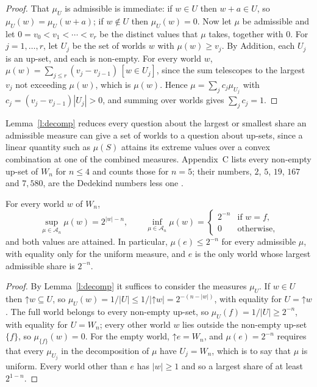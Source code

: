 \documentclass{situationist-preprint}
\begin{document}
\begin{proof}
That $\mu_U$ is admissible is immediate: if $w \in U$ then $w + a \in U$, so $\mu_U(w) = \mu_U(w + a)$; if $w \notin U$ then $\mu_U(w) = 0$. Now let $\mu$ be admissible and let $0 = v_0 < v_1 < \cdots < v_r$ be the distinct values that $\mu$ takes, together with $0$. For $j = 1, \ldots, r$, let $U_j$ be the set of worlds $w$ with $\mu(w) \geq v_j$. By Addition, each $U_j$ is an up-set, and each is non-empty. For every world $w$, $\mu(w) = \sum_{j \leq r} (v_j - v_{j-1})\,[w \in U_j]$, since the sum telescopes to the largest $v_j$ not exceeding $\mu(w)$, which is $\mu(w)$. Hence $\mu = \sum_j c_j \mu_{U_j}$ with $c_j = (v_j - v_{j-1})|U_j| > 0$, and summing over worlds gives $\sum_j c_j = 1$.
\end{proof}

Lemma~\ref{l:decomp} reduces every question about the largest or smallest share an admissible measure can give a set of worlds to a question about up-sets, since a linear quantity such as $\mu(S)$ attains its extreme values over a convex combination at one of the combined measures. Appendix~C lists every non-empty up-set of $W_n$ for $n \leq 4$ and counts those for $n = 5$; their numbers, $2$, $5$, $19$, $167$ and $7{,}580$, are the Dedekind numbers less one \citep{Kleitman1969}.

\begin{proposition}\label{p:extreme}
For every world $w$ of $W_n$,
\[
\sup_{\mu \in \mathcal{A}_n} \mu(w) = 2^{|w| - n}, \qquad \inf_{\mu \in \mathcal{A}_n} \mu(w) = \begin{cases} 2^{-n} & \text{if } w = f,\\ 0 & \text{otherwise,}\end{cases}
\]
and both values are attained. In particular, $\mu(e) \leq 2^{-n}$ for every admissible $\mu$, with equality only for the uniform measure, and $e$ is the only world whose largest admissible share is $2^{-n}$.
\end{proposition}

\begin{proof}
By Lemma~\ref{l:decomp} it suffices to consider the measures $\mu_U$. If $w \in U$ then $\mathord{\uparrow} w \subseteq U$, so $\mu_U(w) = 1/|U| \leq 1/|\mathord{\uparrow} w| = 2^{-(n - |w|)}$, with equality for $U = \mathord{\uparrow} w$. The full world belongs to every non-empty up-set, so $\mu_U(f) = 1/|U| \geq 2^{-n}$, with equality for $U = W_n$; every other world $w$ lies outside the non-empty up-set $\{f\}$, so $\mu_{\{f\}}(w) = 0$. For the empty world, $\mathord{\uparrow} e = W_n$, and $\mu(e) = 2^{-n}$ requires that every $\mu_{U_j}$ in the decomposition of $\mu$ have $U_j = W_n$, which is to say that $\mu$ is uniform. Every world other than $e$ has $|w| \geq 1$ and so a largest share of at least $2^{1-n}$.
\end{proof}
\end{document}
